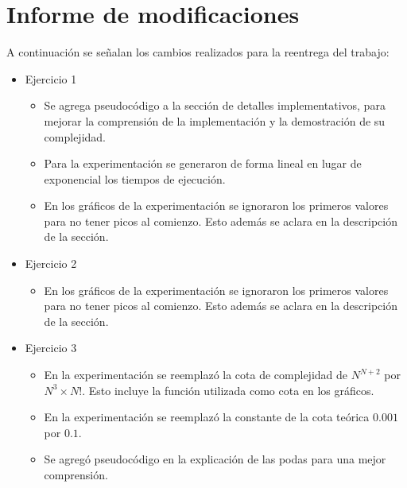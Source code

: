 \section*{Informe de modificaciones}

A continuación se señalan los cambios realizados para la reentrega del trabajo:

\begin{itemize}
	\item{
		Ejercicio 1
		\begin{itemize}
			\item Se agrega pseudocódigo a la sección de detalles implementativos, para mejorar
			la comprensión de la implementación y la demostración de su complejidad.
			\item Para la experimentación se generaron de forma lineal en lugar
			de exponencial los tiempos de ejecución.
			\item En los gráficos de la experimentación se ignoraron los primeros
			valores para no tener picos al comienzo. Esto además se aclara en la
			descripción de la sección.
		\end{itemize}
	}
	\item{
		Ejercicio 2
		\begin{itemize}
			\item En los gráficos de la experimentación se ignoraron los primeros
			valores para no tener picos al comienzo. Esto además se aclara en la
			descripción de la sección.
		\end{itemize}
	}
	\item{
		Ejercicio 3
		\begin{itemize}
			\item En la experimentación se reemplazó la cota de complejidad de $N^{N+2}$ por $N^3 \times N!$. Esto incluye la función utilizada como cota en los gráficos.
			\item En la experimentación se reemplazó la constante de la cota teórica $0.001$ por $0.1$.
			\item Se agregó pseudocódigo en la explicación de las podas para una mejor comprensión.
		\end{itemize}
	}
\end{itemize}
